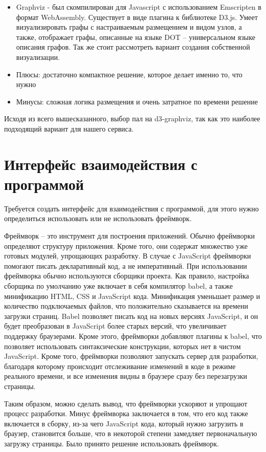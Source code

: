 \begin{itemize}
\item Graphviz - был скомпилирован для Javascript с использованием Emscripten в формат WebAssembly. Существует в виде плагина к библиотеке D3.js. Умеет визуализировать графы с настраиваемым размещением и видом узлов, а также, отображает графы, описанные на языке DOT – универсальном языке описания графов.
Так же стоит рассмотреть вариант создания собственной визуализации.
\item Плюсы: достаточно компактное решение, которое делает именно то, что нужно
\item Минусы: сложная логика размещения и очень затратное по времени решение
\end{itemize}

Исходя из всего вышесказанного, выбор пал на d3-graphviz, так как это наиболее подходящий вариант для нашего сервиса.
\section{Интерфейс взаимодействия с программой} \label{ch4:sec4}
Требуется создать интерфейс для взаимодействия с программой, для этого нужно определиться использовать или не использовать фреймворк.

Фреймворк – это инструмент для построения приложений. Обычно фреймворки определяют структуру приложения. Кроме того, они содержат множество уже готовых модулей, упрощающих разработку. В случае с JavaScript фреймворки помогают писать декларативный код, а не императивный. При использовании фреймворка обычно используются сборщики проекта. Как правило, настройка сборщика по умолчанию уже включает в себя компилятор babel, а также минификацию HTML, CSS и JavaScript кода. Минификация уменьшает размер и количество подключаемых файлов, что положительно сказывается на времени загрузки страниц. Babel позволяет писать код на новых версиях JavaScript, и он будет преобразован в JavaScript более старых версий, что увеличивает поддержку браузерами. Кроме этого, фреймворки добавляют плагины к babel, что позволяет использовать синтаксические конструкции, которых нет в чистом JavaScript. Кроме того, фреймворки позволяют запускать сервер для разработки, благодаря которому происходит отслеживание изменений в коде в режиме реального времени, и все изменения видны в браузере сразу без перезагрузки страницы.

Таким образом, можно сделать вывод, что фреймворки ускоряют и упрощают процесс разработки. Минус фреймворка заключается в том, что его код также включается в сборку, из-за чего JavaScript кода, который нужно загрузить в браузер, становится больше, что в некоторой степени замедляет первоначальную загрузку страницы. Было принято решение использовать фреймворк.
